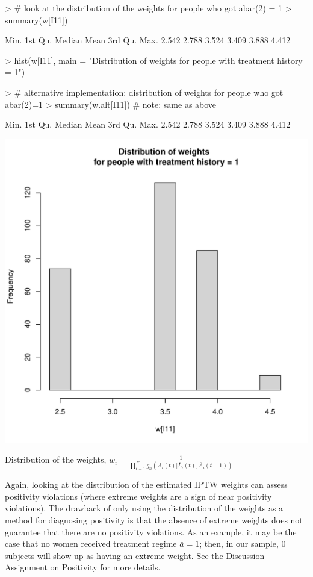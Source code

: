 \documentclass{exam}
\newenvironment{myfigure}{\captionsetup{type=mytype}}{}
\begin{document}
\begin{enumerate}
\begin{solution}
\begin{Schunk}
\begin{Sinput}
> # look at the distribution of the weights for people who got abar(2) = 1 
> summary(w[I11])
\end{Sinput}
\begin{Soutput}
   Min. 1st Qu.  Median    Mean 3rd Qu.    Max. 
  2.542   2.788   3.524   3.409   3.888   4.412 
\end{Soutput}
\begin{Sinput}
> hist(w[I11], main = "Distribution of weights \n for people with treatment history = 1")
\end{Sinput}
\end{Schunk}
\begin{Schunk}
\begin{Sinput}
> # alternative implementation: distribution of weights for people who got abar(2)=1
> summary(w.alt[I11]) # note: same as above
\end{Sinput}
\begin{Soutput}
   Min. 1st Qu.  Median    Mean 3rd Qu.    Max. 
  2.542   2.788   3.524   3.409   3.888   4.412 
\end{Soutput}
\end{Schunk}
\begin{myfigure}
\begin{center}
\includegraphics[width=.4\textwidth]{w11Hist0.pdf}
\caption{Distribution of the weights, $w_i = \frac{1}{\prod_{t=1}^Kg_n(A_i(t)|\bar{L}_i(t), \bar{A}_i(t-1))}$}
\label{Fig:w11Hist0}
\end{center}
\end{myfigure}

Again, looking at the distribution of the estimated IPTW weights can assess positivity violations (where extreme weights are a sign of near positivity violations). The drawback of only using the distribution of the weights as a method for diagnosing positivity is that the absence of extreme weights does not guarantee that there are no positivity violations. As an example, it may be the case that no women received treatment regime $\bar{a}=1$; then, in our sample, 0 subjects will show up as having an extreme weight. See the Discussion Assignment on Positivity for more details. 


\end{solution}
\end{enumerate}
\end{document}
